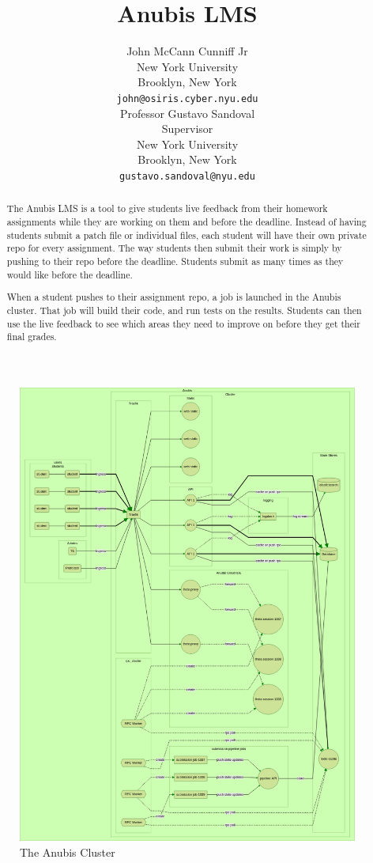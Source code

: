 \documentclass[12pt]{report}
\title{Anubis LMS}
\author{%
    John McCann Cunniff Jr \\
    New York University\\
    Brooklyn, New York \\
    \texttt{john@osiris.cyber.nyu.edu} \\
    \AND{}
    Professor Gustavo Sandoval \\
    Supervisor \\
    New York University\\
    Brooklyn, New York \\
    \texttt{gustavo.sandoval@nyu.edu} \\
}
\begin{document}
    \maketitle

    \begin{abstract}
        The Anubis LMS is a tool to give students live feedback from their homework
        assignments while they are working on them and before the deadline.
        Instead of having students submit a patch file or individual files, each student
        will have their own private repo for every assignment.
        The way students then submit their work is simply by pushing to their repo before
        the deadline.
        Students submit as many times as they would like before the deadline.

        When a student pushes to their assignment repo, a job is launched in the Anubis cluster.
        That job will build their code, and run tests on the results.
        Students can then use the live feedback to see which areas they need to improve on
        before they get their final grades.
    \end{abstract}


    \begin{figure}[h]
        \centering
        \includegraphics[width=1\textwidth]{figures/cluster.mmd}
        \caption{The Anubis Cluster\label{fig:cluster}}
    \end{figure}
\end{document}
